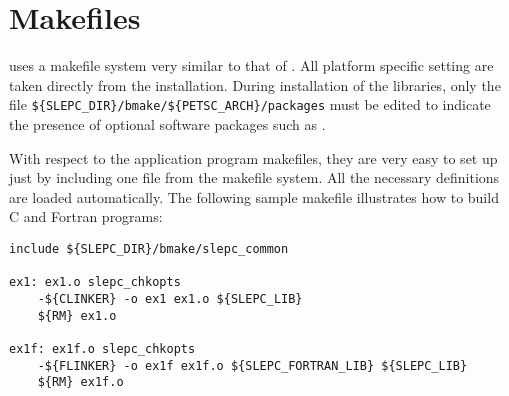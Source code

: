 \section{Makefiles}

	\slepc uses a makefile system very similar to that of \petsc. All platform specific setting are taken directly from the \petsc{} installation. During installation of the \slepc libraries, only the file \Verb!${SLEPC_DIR}/bmake/${PETSC_ARCH}/packages! must be edited to indicate the presence of optional software packages such as \arpack.

	With respect to the application program makefiles, they are very easy to set up just by including one file from the \slepc makefile system. All the necessary \petsc{} definitions are loaded automatically. The following sample makefile illustrates how to build C and Fortran programs:

	\begin{Verbatim}[fontsize=\scriptsize]
include ${SLEPC_DIR}/bmake/slepc_common

ex1: ex1.o slepc_chkopts
	-${CLINKER} -o ex1 ex1.o ${SLEPC_LIB}
	${RM} ex1.o

ex1f: ex1f.o slepc_chkopts
	-${FLINKER} -o ex1f ex1f.o ${SLEPC_FORTRAN_LIB} ${SLEPC_LIB}
	${RM} ex1f.o
	\end{Verbatim}


